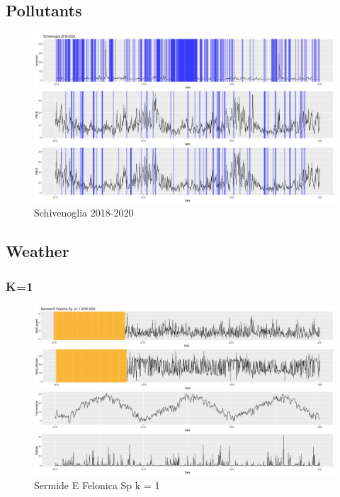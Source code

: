 \documentclass{article}
\begin{document}
\subsection{Pollutants}
\begin{figure}[H]
  \centering
  \includegraphics[scale = 0.4]{Picture/Schivenoglia 2018-2020.jpeg}
  \caption{Schivenoglia 2018-2020}
  \centering
\end{figure}
\subsection{Weather}
\subsubsection{K=1}
\begin{figure}[H]
  \centering 
  \includegraphics[scale = 0.3]{Picture/1/Sermide E Felonica .jpeg}
  \caption{Sermide E Felonica Sp  k = 1}
  \centering
\end{figure}
\end{document}
